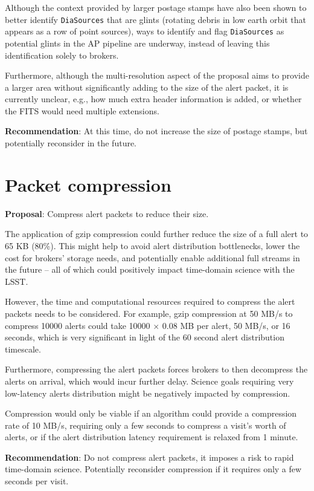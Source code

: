 \documentclass[DM,authoryear,toc]{lsstdoc}
\begin{document}
Although the context provided by larger postage stamps have also been shown to better identify \texttt{DiaSources} that are glints
(rotating debris in low earth orbit that appears as a row of point sources), ways to identify and flag \texttt{DiaSources}
as potential glints in the AP pipeline are underway, instead of leaving this identification solely to brokers.

Furthermore, although the multi-resolution aspect of the proposal aims to provide a larger area without significantly
adding to the size of the alert packet, it is currently unclear, e.g., how much extra header information is added, or whether the
FITS would need multiple extensions.

\textbf{Recommendation}: At this time, do not increase the size of postage stamps, but potentially reconsider in the future.


\section{Packet compression}\label{sec:compression}

\textbf{Proposal}: Compress alert packets to reduce their size.

The application of gzip compression could further reduce the size of a full alert to 65 KB (80\%).
This might help to avoid alert distribution bottlenecks, lower the cost for brokers' storage needs, and potentially enable 
additional full streams in the future -- all of which could positively impact time-domain science with the LSST.

However, the time and computational resources required to compress the alert packets needs to be considered.
For example, gzip compression at 50 MB/s to compress 10000 alerts could take 10000 $\times$ 0.08 MB per alert, 50 MB/s, or 
16 seconds, which is very significant in light of the 60 second alert distribution timescale. 

Furthermore, compressing the alert packets forces brokers to then decompress the alerts on arrival, which would incur further delay.
Science goals requiring very low-latency alerts distribution might be negatively impacted by compression.

Compression would only be viable if an algorithm could provide a compression rate of 10 MB/s, requiring only a few seconds 
to compress a visit's worth of alerts, or if the alert distribution latency requirement is relaxed from 1 minute.

\textbf{Recommendation}: Do not compress alert packets, it imposes a risk to rapid time-domain science.
Potentially reconsider compression if it requires only a few seconds per visit.
\end{document}
